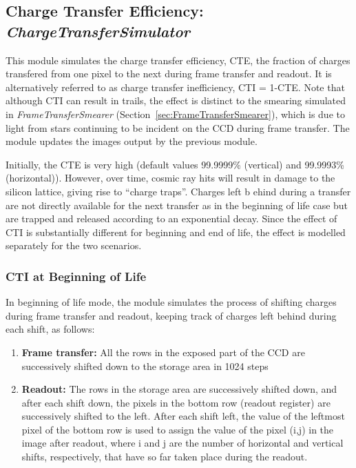 \documentclass[11pt]{article}      %
\def\HCode#1{}
\def\htmlanchor#1{\HCode{<a id="#1"></a>}}
\begin{document}
\clearpage
\htmlanchor{ChargeTransferSimulator}
\subsection{Charge Transfer Efficiency:  {\it ChargeTransferSimulator}}
\label{sec:ChargeTransferSimulator}

This module simulates the charge transfer efficiency, CTE, the fraction of charges transfered from one pixel to the next during frame transfer and readout. It is alternatively referred to as charge transfer inefficiency, CTI = 1-CTE.  Note that although CTI can result in trails, the effect is distinct to the smearing simulated in {\it FrameTransferSmearer} (Section~\ref{sec:FrameTransferSmearer}), which is due to light from stars continuing to be incident on the CCD during frame transfer. The module updates the images output by the previous module.

Initially, the CTE is very high (default values 99.9999\% (vertical) and 99.9993\% (horizontal)). However, over time, cosmic ray hits will result in damage to the silicon lattice, giving rise to ``charge traps''. Charges left b
ehind during a transfer are not directly available for the next transfer as in the beginning of life case but are trapped and released according to an exponential decay. Since the effect of CTI is substantially different for beginning and end of life, the effect is modelled separately for the two scenarios.

\htmlanchor{beginOfLife}
\subsubsection{CTI at Beginning of Life}

In beginning of life mode, the module simulates the process of shifting charges during frame transfer and readout, keeping track of charges left behind during each shift, as follows:
\begin{enumerate}
\item {\bf Frame transfer:} All the rows in the exposed part of the CCD are successively shifted down to the storage area in 1024 steps
\item {\bf Readout:} The rows in the storage area are successively shifted down, and after each shift down, the pixels in the bottom row (readout register) are successively shifted to the left. After each shift left, the value of the leftmost pixel of the bottom row is used to assign the value of the pixel (i,j) in the image after readout, where i and j are the number of horizontal and vertical shifts, respectively, that have so far taken place during the readout.
\end{enumerate}
\end{document}
